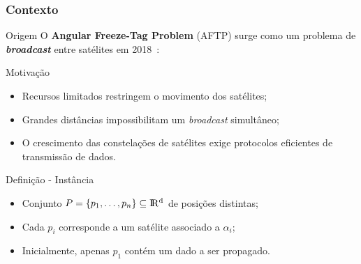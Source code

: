 
\subsubsection{Contexto}

\stopcounter
\begin{frame}{Origem}
  O \textbf{Angular Freeze-Tag Problem} (AFTP) surge como um problema de \textbf{\emph{broadcast}} entre satélites em 2018~\cite{Fe18}:
  \bigbreak
  \begin{minipage}{\linewidth}
    \centering
    \colorbox{white}{}
  \end{minipage}
\end{frame}
\inccounter

\begin{frame}{Motivação}
  \begin{itemize}[<+->]

    \item Recursos limitados restringem o movimento dos satélites;

    \item Grandes distâncias impossibilitam um \emph{broadcast} simultâneo;

    \item O crescimento das constelações de satélites exige protocolos eficientes de transmissão de dados.

  \end{itemize}
\end{frame}

\begin{frame}{Definição - Instância}
  \begin{itemize}[<+->]

    \item Conjunto $P = \{p_1, \dots, p_n\}\subseteq \rm I\!R^d$ de posições distintas;

    \item Cada $p_i$ corresponde a um satélite associado a $\alpha_i$;

    \item Inicialmente, apenas $p_1$ contém um dado a ser propagado.

  \end{itemize}
\end{frame}

